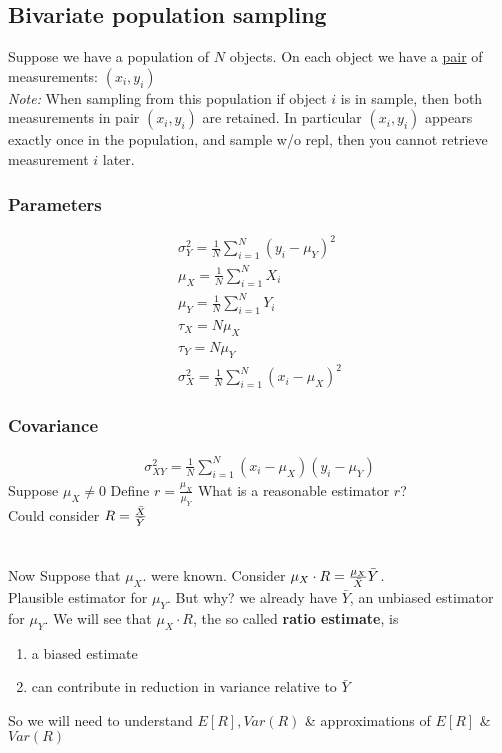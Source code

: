 \subsection*{Bivariate population sampling}
Suppose we have a population of $N$ objects. On each object we have a \underline{pair} of measurements: $(x_i, y_i)$\\
\emph{Note: } When sampling from this population if object $i$ is in sample, then both measurements in pair $(x_i, y_i)$ are retained. In particular $(x_i, y_i)$ appears exactly once in the population, and sample w/o repl, then you cannot retrieve measurement $i$ later.\\
\subsubsection*{Parameters}
\begin{multicols}{3}
	\begin{gather*}
	\sigma_Y^2 = \frac{1}{N} \sum_{i=1}^N (y_i - \mu_Y)^2\\
	\mu_X = \frac{1}{N} \sum_{i=1}^N X_i\\ 
	\mu_Y = \frac{1}{N} \sum_{i=1}^N Y_i\\
	\tau_X = N\mu_X\\ \tau_Y = N\mu_Y\\
	\sigma_X^2 = \frac{1}{N} \sum_{i=1}^N (x_i - \mu_X)^2
	\end{gather*}
\end{multicols}
\subsubsection*{Covariance}
\begin{gather*}
	\sigma_{XY}^2 = \frac{1}{N} \sum_{i=1}^N (x_i - \mu_X)(y_i - \mu_Y)
\end{gather*}
Suppose $\mu_X \neq 0$ \hspace{5em} Define $r = \frac{\mu_X}{\mu_Y}$ \hspace{5em} What is a reasonable estimator $r$?\\
Could consider $R = \frac{\bar{X}}{\bar{Y}}$\\
\redhline\\\\
Now Suppose that $\mu_X$. were known. Consider $\mu_X \cdot R = \frac{\mu_X}{\bar{X}} \bar{Y}$.\\ Plausible estimator for $\mu_Y$. But why? we already have $\bar{Y}$, an unbiased estimator for $\mu_Y$. We will see that $\mu_X \cdot R$, the so called \textbf{ratio estimate}, is
\begin{enumerate}[label=\protect\circled{\arabic*}]
	\item a biased estimate
	\item can contribute in reduction in variance relative to $\bar{Y}$
\end{enumerate}
So we will need to understand $E[R], Var(R)$ \& approximations of $E[R]$ \& $Var(R)$
